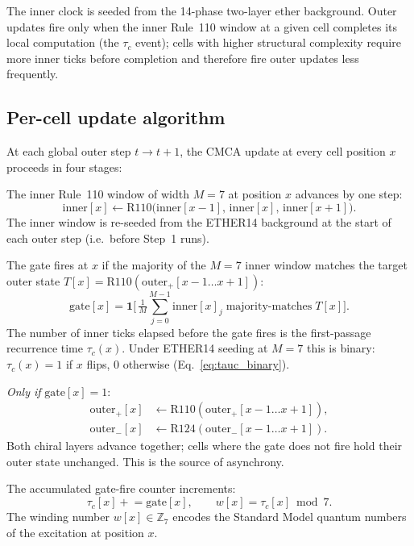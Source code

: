 \documentclass[11pt]{article}
\theoremstyle{remark}
\newcommand{\ZS}{\mathbb{Z}_7}
\begin{document}


The inner clock is seeded from the 14-phase two-layer ether background.
Outer updates fire only when the inner Rule~110 window at a given cell
completes its local computation (the $\tau_c$ event); cells with higher
structural complexity require more inner ticks before completion and therefore
fire outer updates less frequently.

\subsection{Per-cell update algorithm}
\label{ssec:update_algorithm}

At each global outer step $t\to t+1$, the CMCA update at every cell position
$x$ proceeds in four stages:

\begin{description}[leftmargin=1.2cm]
  \item[Step~1 (Inner clock advance):] The inner Rule~110 window of width $M=7$
    at position $x$ advances by one step:
    \[
      \mathrm{inner}[x] \leftarrow
      \mathrm{R110}\!\bigl(\mathrm{inner}[x-1],\,\mathrm{inner}[x],\,\mathrm{inner}[x+1]\bigr).
    \]
    The inner window is re-seeded from the ETHER14 background at the
    start of each outer step (i.e.\ before Step~1 runs).

  \item[Step~2 (Gate check):] The gate fires at $x$ if the majority
    of the $M=7$ inner window matches the target outer state
    $T[x] = \mathrm{R110}(\text{outer}_{+}[x-1\ldots x+1])$:
    \[
      \mathrm{gate}[x] = \mathbf{1}\!\bigl[\,
        \tfrac{1}{M}\textstyle\sum_{j=0}^{M-1}\mathrm{inner}[x]_j
        \;\text{majority-matches}\; T[x]\bigr].
    \]
    The number of inner ticks elapsed before the gate fires is the
    first-passage recurrence time $\tau_c(x)$.  Under ETHER14 seeding
    at $M=7$ this is binary: $\tau_c(x)=1$ if $x$ flips, $0$ otherwise
    (Eq.~\eqref{eq:tauc_binary}).

  \item[Step~3 (Conditional outer update):] \emph{Only if} $\mathrm{gate}[x]=1$:
    \begin{align*}
      \text{outer}_{+}[x] &\leftarrow \mathrm{R110}(\text{outer}_{+}[x-1\ldots x+1]), \\
      \text{outer}_{-}[x] &\leftarrow \mathrm{R124}(\text{outer}_{-}[x-1\ldots x+1]).
    \end{align*}
    Both chiral layers advance together; cells where the gate does not fire
    hold their outer state unchanged.  This is the source of asynchrony.

  \item[Step~4 (Winding readout):] The accumulated gate-fire counter increments:
    \[
      \tau_{c}[x] \mathrel{+}= \mathrm{gate}[x],
      \qquad
      w[x] = \tau_{c}[x] \bmod 7.
    \]
    The winding number $w[x]\in\ZS$ encodes the Standard Model quantum numbers
    of the excitation at position $x$.
\end{description}
\end{document}
